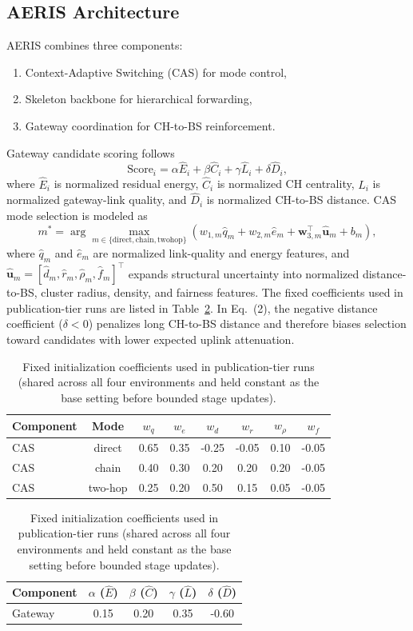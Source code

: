 ﻿\documentclass[sensors,article,submit,moreauthors,pdftex]{Definitions/mdpi}
\begin{document}
\subsection{AERIS Architecture}
AERIS combines three components:
\begin{enumerate}
\item Context-Adaptive Switching (CAS) for mode control,
\item Skeleton backbone for hierarchical forwarding,
\item Gateway coordination for CH-to-BS reinforcement.
\end{enumerate}
Gateway candidate scoring follows
\begin{equation}
\mathrm{Score}_i = \alpha \hat{E}_i + \beta \hat{C}_i + \gamma \hat{L}_i + \delta \hat{D}_i,
\end{equation}
where $\hat{E}_i$ is normalized residual energy, $\hat{C}_i$ is normalized CH centrality, $\hat{L}_i$ is normalized gateway-link quality, and $\hat{D}_i$ is normalized CH-to-BS distance.
CAS mode selection is modeled as
\begin{equation}
m^{*}=\arg\max_{m\in\{\mathrm{direct},\mathrm{chain},\mathrm{twohop}\}}
\left(w_{1,m}\hat{q}_{m}+w_{2,m}\hat{e}_{m}+\mathbf{w}_{3,m}^{\top}\hat{\mathbf{u}}_{m}+b_m\right),
\end{equation}
where $\hat{q}_{m}$ and $\hat{e}_{m}$ are normalized link-quality and energy features, and $\hat{\mathbf{u}}_{m}=[\hat{d}_{m},\hat{r}_{m},\hat{\rho}_{m},\hat{f}_{m}]^{\top}$ expands structural uncertainty into normalized distance-to-BS, cluster radius, density, and fairness features.
The fixed coefficients used in publication-tier runs are listed in Table~\ref{tab:cas_gateway_coeffs}. In Eq.~(2), the negative distance coefficient ($\delta<0$) penalizes long CH-to-BS distance and therefore biases selection toward candidates with lower expected uplink attenuation.
\begin{table}[H]
\caption{Fixed initialization coefficients used in publication-tier runs (shared across all four environments and held constant as the base setting before bounded stage updates).}
\label{tab:cas_gateway_coeffs}
\centering
\small
\begin{tabular}{lccccccc}
\toprule
Component & Mode & $w_q$ & $w_e$ & $w_d$ & $w_r$ & $w_{\rho}$ & $w_f$ \\
\midrule
CAS & direct & 0.65 & 0.35 & -0.25 & -0.05 & 0.10 & -0.05 \\
CAS & chain & 0.40 & 0.30 & 0.20 & 0.20 & 0.20 & -0.05 \\
CAS & two-hop & 0.25 & 0.20 & 0.50 & 0.15 & 0.05 & -0.05 \\
\bottomrule
\end{tabular}
\vspace{1.5mm}
\begin{tabular}{lcccc}
\toprule
Component & $\alpha$ ($\hat{E}$) & $\beta$ ($\hat{C}$) & $\gamma$ ($\hat{L}$) & $\delta$ ($\hat{D}$) \\
\midrule
Gateway & 0.15 & 0.20 & 0.35 & -0.60 \\
\bottomrule
\end{tabular}
\end{table}
\end{document}
